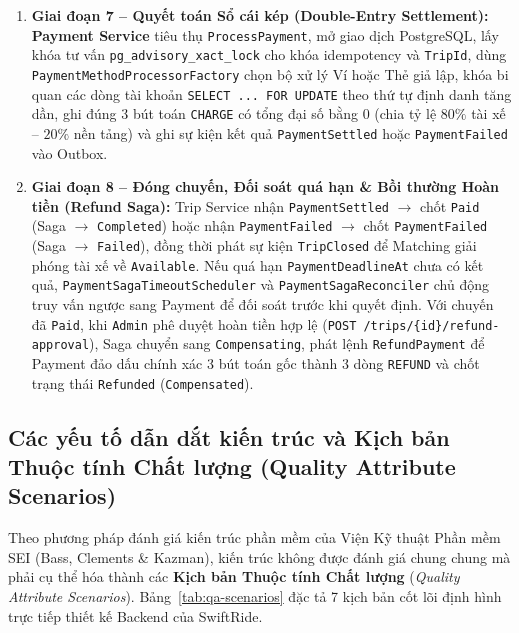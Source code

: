 \documentclass[12pt,a4paper]{article}
\begin{document}
\begin{enumerate}[leftmargin=1.6em]
    \item \textbf{Giai đoạn 7 -- Quyết toán Sổ cái kép (Double-Entry Settlement):} \textbf{Payment Service} tiêu thụ \texttt{ProcessPayment}, mở giao dịch PostgreSQL, lấy khóa tư vấn \texttt{pg\_advisory\_xact\_lock} cho khóa idempotency và \texttt{TripId}, dùng \texttt{PaymentMethodProcessorFactory} chọn bộ xử lý Ví hoặc Thẻ giả lập, khóa bi quan các dòng tài khoản \texttt{SELECT ... FOR UPDATE} theo thứ tự định danh tăng dần, ghi đúng 3 bút toán \texttt{CHARGE} có tổng đại số bằng $0$ (chia tỷ lệ $80\%$ tài xế -- $20\%$ nền tảng) và ghi sự kiện kết quả \texttt{PaymentSettled} hoặc \texttt{PaymentFailed} vào Outbox.
    \item \textbf{Giai đoạn 8 -- Đóng chuyến, Đối soát quá hạn \& Bồi thường Hoàn tiền (Refund Saga):} Trip Service nhận \texttt{PaymentSettled} $\rightarrow$ chốt \texttt{Paid} (Saga $\rightarrow$ \texttt{Completed}) hoặc nhận \texttt{PaymentFailed} $\rightarrow$ chốt \texttt{PaymentFailed} (Saga $\rightarrow$ \texttt{Failed}), đồng thời phát sự kiện \texttt{TripClosed} để Matching giải phóng tài xế về \texttt{Available}. Nếu quá hạn \texttt{PaymentDeadlineAt} chưa có kết quả, \texttt{PaymentSagaTimeoutScheduler} và \texttt{PaymentSagaReconciler} chủ động truy vấn ngược sang Payment để đối soát trước khi quyết định. Với chuyến đã \texttt{Paid}, khi \texttt{Admin} phê duyệt hoàn tiền hợp lệ (\texttt{POST /trips/\{id\}/refund-approval}), Saga chuyển sang \texttt{Compensating}, phát lệnh \texttt{RefundPayment} để Payment đảo dấu chính xác 3 bút toán gốc thành 3 dòng \texttt{REFUND} và chốt trạng thái \texttt{Refunded} (\texttt{Compensated}).
\end{enumerate}

\subsection{Các yếu tố dẫn dắt kiến trúc và Kịch bản Thuộc tính Chất lượng (Quality Attribute Scenarios)}
Theo phương pháp đánh giá kiến trúc phần mềm của Viện Kỹ thuật Phần mềm SEI (Bass, Clements \& Kazman), kiến trúc không được đánh giá chung chung mà phải cụ thể hóa thành các \textbf{Kịch bản Thuộc tính Chất lượng} (\textit{Quality Attribute Scenarios}). Bảng~\ref{tab:qa-scenarios} đặc tả 7 kịch bản cốt lõi định hình trực tiếp thiết kế Backend của SwiftRide.
\end{document}
